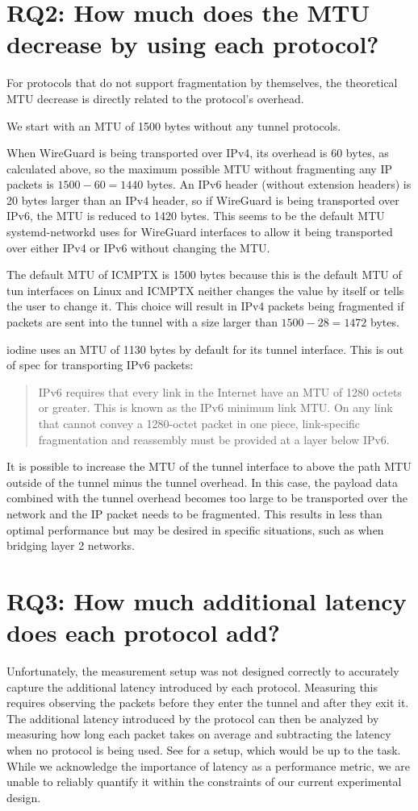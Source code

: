 \section{RQ2: How much does the MTU decrease by using each protocol?}
For protocols that do not support fragmentation by themselves, the theoretical MTU decrease is directly related to the protocol's overhead.

We start with an MTU of 1500 bytes without any tunnel protocols.

When WireGuard is being transported over IPv4, its overhead is 60 bytes, as calculated above, so the maximum possible MTU without fragmenting any IP packets is $1500 - 60 = 1440$ bytes.
An IPv6 header (without extension headers) is 20 bytes larger than an IPv4 header, so if WireGuard is being transported over IPv6, the MTU is reduced to 1420 bytes.
This seems to be the default MTU systemd-networkd uses for WireGuard interfaces to allow it being transported over either IPv4 or IPv6 without changing the MTU.

The default MTU of ICMPTX is 1500 bytes because this is the default MTU of tun interfaces on Linux and ICMPTX neither changes the value by itself or tells the user to change it.
This choice will result in IPv4 packets being fragmented if packets are sent into the tunnel with a size larger than $1500 - 28 = 1472$ bytes.

iodine uses an MTU of 1130 bytes by default for its tunnel interface.
This is out of spec for transporting IPv6 packets:
\blockquote[\cite{RFC8200}]{IPv6 requires that every link in the Internet have an MTU of 1280 octets or greater.
This is known as the IPv6 minimum link MTU.
On any link that cannot convey a 1280-octet packet in one piece, link-specific fragmentation and reassembly must be provided at a layer below IPv6.}

It is possible to increase the MTU of the tunnel interface to above the path MTU outside of the tunnel minus the tunnel overhead.
In this case, the payload data combined with the tunnel overhead becomes too large to be transported over the network and the IP packet needs to be fragmented.
This results in less than optimal performance but may be desired in specific situations, such as when bridging layer 2 networks.


\section{RQ3: How much additional latency does each protocol add?}
Unfortunately, the measurement setup was not designed correctly to accurately capture the additional latency introduced by each protocol.
Measuring this requires observing the packets before they enter the tunnel and after they exit it.
The additional latency introduced by the protocol can then be analyzed by measuring how long each packet takes on average and subtracting the latency when no protocol is being used.
See  for a setup, which would be up to the task.
While we acknowledge the importance of latency as a performance metric, we are unable to reliably quantify it within the constraints of our current experimental design.



